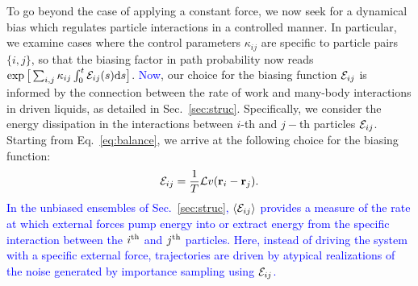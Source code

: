 \documentclass[superscriptaddress, twocolumn, prx, longbibliography, nofootinbib]{revtex4-1}
\newcommand{\tn}[1]{{\color{red}#1}}
\begin{document}
To go beyond the case of applying a constant force, we now seek for a dynamical bias which regulates particle interactions in a controlled manner. In particular, we examine cases where the control parameters $\kappa_{ij}$ are specific to particle pairs $\{i,j\}$, so that the biasing factor in path probability now reads $\exp\big[\sum_{i,j}\kappa_{ij}\int_0^t{\cal E}_{ij}(s){\rm d}s\big]$. \textcolor{blue}{Now}, our choice for the biasing function ${\cal E}_{ij}$ is informed by the connection between the rate of work and many-body interactions in driven liquids, as detailed in Sec.~\ref{sec:struc}. 
\tn{Specifically, we consider the energy dissipation in the interactions between $i$-th and $j-$th particles ${\cal E}_{ij}$. Starting from Eq.~\ref{eq:balance}, we arrive at the following choice for the biasing function:}
\begin{equation}\label{eq:eps_bis}
	{\cal E}_{ij} = \frac{1}{T} {\cal L} v({\bf r}_i-{\bf r}_j) .
\end{equation}
\textcolor{blue}{In the unbiased ensembles of Sec.~\ref{sec:struc}, $\langle {\cal E}_{ij} \rangle$ provides a measure of the rate at which external forces pump energy into or extract energy from the specific interaction between the $i^{\rm th}$ and $j^{\rm th}$ particles. Here, instead of driving the system with a specific external force, trajectories are driven by atypical realizations of the noise generated by importance sampling using ${\cal E}_{ij}$.}
\end{document}
